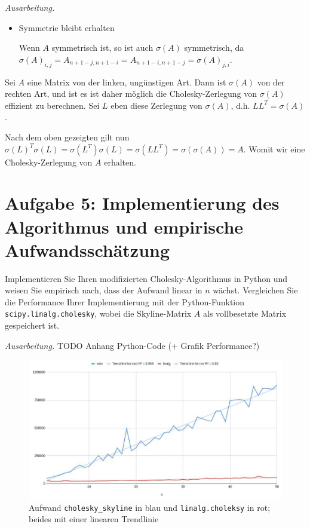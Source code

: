 \documentclass[]{article}
\newenvironment{ausarbeitung}{\vspace{3mm}\noindent\textit{Ausarbeitung.}}{}
\begin{document}
\begin{ausarbeitung}
\begin{itemize}
		\item Symmetrie bleibt erhalten
		
		Wenn $A$ symmetrisch ist, so ist auch $\sigma(A)$ symmetrisch, da $\sigma(A)_{i,j} = A_{n+1-j,n+1-i} = A_{n+1-i,n+1-j} = \sigma(A)_{j,i}$.	
	\end{itemize}

	Sei $A$ eine Matrix von der linken, ungünstigen Art. Dann ist $\sigma(A)$ von der rechten Art, und ist es ist daher möglich die Cholesky-Zerlegung von $\sigma(A)$ effizient zu berechnen. Sei $L$ eben diese Zerlegung von $\sigma(A)$, d.h. $LL^T=\sigma(A)$.
	
	Nach dem oben gezeigten gilt nun $\sigma(L)^T\sigma(L) = \sigma(L^T)\sigma(L) = \sigma(LL^T) = \sigma(\sigma(A)) = A$. Womit wir eine Cholesky-Zerlegung von $A$ erhalten.
\end{ausarbeitung}


\section*{Aufgabe 5: Implementierung des Algorithmus und empirische Aufwandsschätzung}
Implementieren Sie Ihren modifizierten Cholesky-Algorithmus in Python und weisen Sie empirisch nach, dass der Aufwand linear in $n$ wächst. Vergleichen Sie die Performance Ihrer Implementierung mit der Python-Funktion \texttt{scipy.linalg.cholesky}, wobei die Skyline-Matrix $A$ als vollbesetzte Matrix gespeichert ist.

\begin{ausarbeitung}
	TODO Anhang Python-Code (+ Grafik Performance?)
	
	\begin{figure}
		\centering
		\includegraphics[width=\linewidth]{aufwand_cholesky}
		\caption{Aufwand \texttt{cholesky\_skyline} in blau und \texttt{linalg.choleksy} in rot; beides mit einer linearen Trendlinie}
		\label{fig:aufwandcholesky}
	\end{figure}
	
\end{ausarbeitung}
\end{document}

